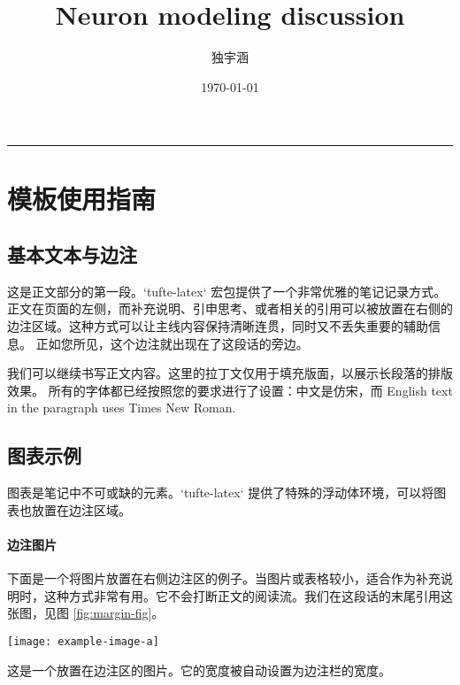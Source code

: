 \documentclass[nols, a4paper]{tufte-handout}
\title{Neuron modeling discussion}
\author{独宇涵}
\date{\today}
\begin{document}
\onehalfspacing 

\maketitle

\tableofcontents

\bigskip
\noindent\rule{\linewidth}{0.4pt}
\bigskip

\section{模板使用指南}

\subsection{基本文本与边注} 
这是正文部分的第一段。`tufte-latex` 宏包提供了一个非常优雅的笔记记录方式。正文在页面的左侧，而补充说明、引申思考、或者相关的引用可以被放置在右侧的边注区域。这种方式可以让主线内容保持清晰连贯，同时又不丢失重要的辅助信息。 正如您所见，这个边注就出现在了这段话的旁边。

我们可以继续书写正文内容。\lipsum[1][1-4] 这里的拉丁文仅用于填充版面，以展示长段落的排版效果。 所有的字体都已经按照您的要求进行了设置：中文是仿宋，而 English text in the paragraph uses Times New Roman.

\subsection{图表示例} 

图表是笔记中不可或缺的元素。`tufte-latex` 提供了特殊的浮动体环境，可以将图表也放置在边注区域。

\paragraph{边注图片}
下面是一个将图片放置在右侧边注区的例子。当图片或表格较小，适合作为补充说明时，这种方式非常有用。它不会打断正文的阅读流。我们在这段话的末尾引用这张图，见图 \ref{fig:margin-fig}。

\begin{marginfigure}
  \texttt{[image: example-image-a]} 
  \caption{这是一个放置在边注区的图片。它的宽度被自动设置为边注栏的宽度。}
  \label{fig:margin-fig}
\end{marginfigure}
\end{document}
